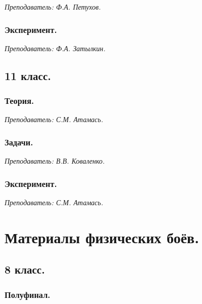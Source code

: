 \documentclass[12pt]{article}
\newlength{\h}
\newlength{\x}
\begin{document}
\textit{Преподаватель: Ф.А. Петухов.}

\subsubsection{Эксперимент.}
\label{sec:daily10exp}

\textit{Преподаватель: Ф.А. Затылкин.}\\

\subsection{11 класс.}
\label{sec:daily11}

\subsubsection{Теория.}
\label{sec:daily11th}

\textit{Преподаватель: С.М. Атамась.}\\

\subsubsection{Задачи.}
\label{sec:daily11pr}

\textit{Преподаватель: В.В. Коваленко.}\\

\subsubsection{Эксперимент.}
\label{sec:daily11exp}

\textit{Преподаватель: С.М. Атамась.}\\

\clearpage

\section{Материалы физических боёв. }
\label{sec:battles}

\subsection{8 класс.}
\label{sec:battle8}

\subsubsection{Полуфинал.}
\label{sec:battle8sf}
\end{document}
